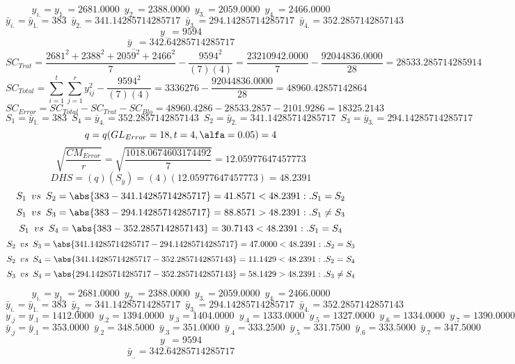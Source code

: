 % 
% 
% 
% 
% 
% 
% 
$$y_{i.}=y_{1.}=2681.0000 \enspace y_{2.}=2388.0000 \enspace y_{3.}=2059.0000 \enspace y_{4.}=2466.0000$$
$$\bar{y}_{i.}=\bar{y}_{1.}=383 \enspace \bar{y}_{2.}=341.14285714285717 \enspace \bar{y}_{3.}=294.14285714285717 \enspace \bar{y}_{4.}=352.2857142857143$$
$$y_{..}=9594$$
$$\bar{y}_{..}=342.64285714285717$$
$$SC_{Trat}=\frac{2681^{2}+2388^{2}+2059^{2}+2466^{2}}{7}-\frac{9594^{2}}{(7)(4)}=\frac{23210942.0000}{7}-\frac{92044836.0000}{28}=28533.285714285914$$
$$SC_{Total}=\sum_{i=1}^{\mathit{t}}\sum_{j=1}^{\mathit{r}}y_{ij}^{2}-\frac{9594^{2}}{(7)(4)}=3336276-\frac{92044836.0000}{28}=48960.42857142864$$
$$SC_{Error}=SC_{Total}-SC_{Trat}-SC_{Blo}=48960.4286-28533.2857-2101.9286=18325.2143$$
$$S_{1}=\bar{y}_{1.}=383 \enspace S_{4}=\bar{y}_{4.}=352.2857142857143 \enspace S_{2}=\bar{y}_{2.}=341.14285714285717 \enspace S_{3}=\bar{y}_{3.}=294.14285714285717$$
$$q=q(GL_{Error}=18, t=4, \alfa=0.05)=4$$
$$\sqrt{\frac{CM_{Error}}{r}}=\sqrt{\frac{1018.0674603174492}{7}}=12.05977647457773$$
$$DHS=(q)(S_{\bar{y}})=(4)(12.05977647457773)=48.2391$$
$$S_{1} \enspace vs \enspace S_{2} = \abs{383-341.14285714285717}=41.8571<48.2391:.S_{1}=S_{2}$$
$$S_{1} \enspace vs \enspace S_{3} = \abs{383-294.14285714285717}=88.8571>48.2391:.S_{1}\not=S_{3}$$
$$S_{1} \enspace vs \enspace S_{4} = \abs{383-352.2857142857143}=30.7143<48.2391:.S_{1}=S_{4}$$
$$S_{2} \enspace vs \enspace S_{3} = \abs{341.14285714285717-294.14285714285717}=47.0000<48.2391:.S_{2}=S_{3}$$
$$S_{2} \enspace vs \enspace S_{4} = \abs{341.14285714285717-352.2857142857143}=11.1429<48.2391:.S_{2}=S_{4}$$
$$S_{3} \enspace vs \enspace S_{4} = \abs{294.14285714285717-352.2857142857143}=58.1429>48.2391:.S_{3}\not=S_{4}$$


$$y_{i.}=y_{1.}=2681.0000 \enspace y_{2.}=2388.0000 \enspace y_{3.}=2059.0000 \enspace y_{4.}=2466.0000$$
$$\bar{y}_{i.}=\bar{y}_{1.}=383 \enspace \bar{y}_{2.}=341.14285714285717 \enspace \bar{y}_{3.}=294.14285714285717 \enspace \bar{y}_{4.}=352.2857142857143$$
$$y_{.j}=y_{.1}=1412.0000 \enspace y_{.2}=1394.0000 \enspace y_{.3}=1404.0000 \enspace y_{.4}=1333.0000 \enspace y_{.5}=1327.0000 \enspace y_{.6}=1334.0000 \enspace y_{.7}=1390.0000$$
$$\bar{y}_{.j}=\bar{y}_{.1}=353.0000 \enspace \bar{y}_{.2}=348.5000 \enspace \bar{y}_{.3}=351.0000 \enspace \bar{y}_{.4}=333.2500 \enspace \bar{y}_{.5}=331.7500 \enspace \bar{y}_{.6}=333.5000 \enspace \bar{y}_{.7}=347.5000$$
$$y_{..}=9594$$
$$\bar{y}_{..}=342.64285714285717$$

